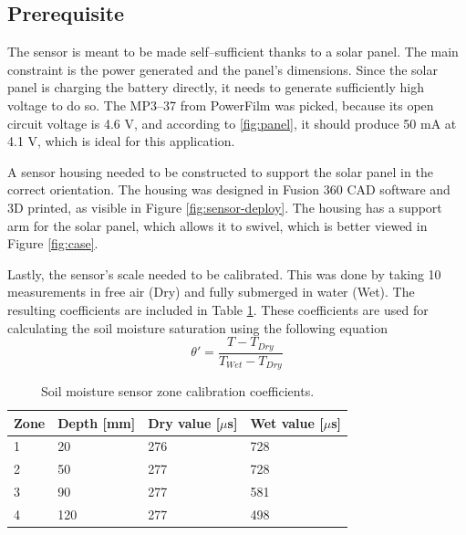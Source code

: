 \subsection{Prerequisite}
The sensor is meant to be made self--sufficient thanks to a solar panel. The main constraint is the power generated and the panel's dimensions. Since the solar panel is charging the battery directly, it needs to generate sufficiently high voltage to do so. The MP3--37 from PowerFilm was picked, because its open circuit voltage is 4.6 V, and according to \ref{fig:panel}, it should produce 50 mA at 4.1 V, which is ideal for this application.


A sensor housing needed to be constructed to support the solar panel in the correct orientation. The housing was designed in Fusion 360 CAD software and 3D printed, as visible in Figure \ref{fig:sensor-deploy}. The housing has a support arm for the solar panel, which allows it to swivel, which is better viewed in Figure \ref{fig:case}.

Lastly, the sensor's scale needed to be calibrated. This was done by taking 10 measurements in free air (Dry) and fully submerged in water (Wet). The resulting coefficients are included in Table \ref{table:sensor-calibration}. These coefficients are used for calculating the soil moisture saturation using the following equation
\begin{equation}
    \theta' = \dfrac{T - T_{Dry}}{T_{Wet} - T_{Dry}}
\end{equation}

\begin{table}
\begin{center}
\caption{\label{table:sensor-calibration}Soil moisture sensor zone calibration coefficients.}
    \begin{tabular}{|l|l|l|l|} \hline
    \textbf{Zone} & \textbf{Depth [mm]} & \textbf{Dry value [$\mu$s]} & \textbf{Wet value [$\mu$s]} \\ \hline
    1 & 20 & 276 & 728 \\ \hline
    2 & 50 & 277 & 728 \\ \hline
    3 & 90 & 277 & 581 \\ \hline
    4 & 120 & 277 & 498 \\ \hline
    \end{tabular}
\end{center}
\end{table}

